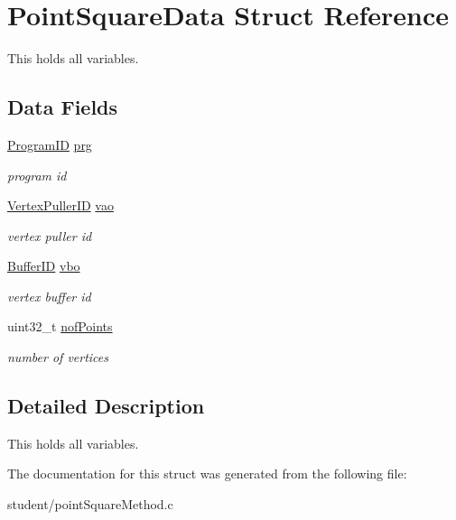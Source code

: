 \hypertarget{structPointSquareData}{}\section{Point\+Square\+Data Struct Reference}
\label{structPointSquareData}


This holds all variables.  


\subsection*{Data Fields}
\begin{DoxyCompactItemize}
\item 
\mbox{\label{structPointSquareData_ad5b410843ab9cbbde5701a75eccbd0e0}} 
\hyperlink{student_2fwd_8h_a15e62786033208aec9487a51e808f81d}{Program\+ID} \hyperlink{structPointSquareData_ad5b410843ab9cbbde5701a75eccbd0e0}{prg}
\begin{DoxyCompactList}\small\item\em program id \end{DoxyCompactList}\item 
\mbox{\label{structPointSquareData_ade598a851eaaac032131ed5d61fdee0c}} 
\hyperlink{student_2fwd_8h_a23828e2281a794e193ebaf0df3e1f17c}{Vertex\+Puller\+ID} \hyperlink{structPointSquareData_ade598a851eaaac032131ed5d61fdee0c}{vao}
\begin{DoxyCompactList}\small\item\em vertex puller id \end{DoxyCompactList}\item 
\mbox{\label{structPointSquareData_ab25c3cbf6d8d0e549b4134fe8310cf71}} 
\hyperlink{student_2fwd_8h_a60a12bf4868ebe47cc571ce96a03f99c}{Buffer\+ID} \hyperlink{structPointSquareData_ab25c3cbf6d8d0e549b4134fe8310cf71}{vbo}
\begin{DoxyCompactList}\small\item\em vertex buffer id \end{DoxyCompactList}\item 
\mbox{\label{structPointSquareData_ae6ea4fe73b1bd8c83ff2de1d6183b841}} 
uint32\+\_\+t \hyperlink{structPointSquareData_ae6ea4fe73b1bd8c83ff2de1d6183b841}{nof\+Points}
\begin{DoxyCompactList}\small\item\em number of vertices \end{DoxyCompactList}\end{DoxyCompactItemize}


\subsection{Detailed Description}
This holds all variables. 

The documentation for this struct was generated from the following file\+:\begin{DoxyCompactItemize}
\item 
student/point\+Square\+Method.\+c\end{DoxyCompactItemize}
